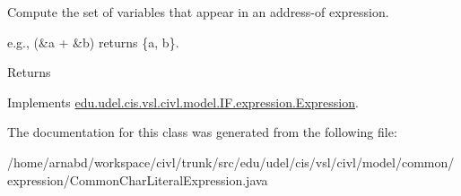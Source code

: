 Compute the set of variables that appear in an address-\/of expression. 

e.\+g., {\ttfamily (\&a + \&b)} returns {\ttfamily \{a, b\}}.

\begin{DoxyReturn}{Returns}

\end{DoxyReturn}


Implements \hyperlink{interfaceedu_1_1udel_1_1cis_1_1vsl_1_1civl_1_1model_1_1IF_1_1expression_1_1Expression_ac2ad0236534bec54b91ee78ff658cbe0}{edu.\+udel.\+cis.\+vsl.\+civl.\+model.\+I\+F.\+expression.\+Expression}.



The documentation for this class was generated from the following file\+:\begin{DoxyCompactItemize}
\item 
/home/arnabd/workspace/civl/trunk/src/edu/udel/cis/vsl/civl/model/common/expression/Common\+Char\+Literal\+Expression.\+java\end{DoxyCompactItemize}
